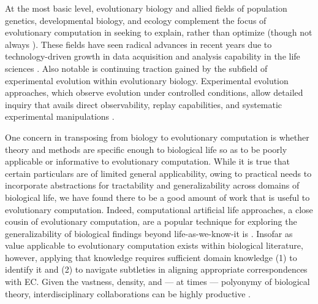At the most basic level, evolutionary biology and allied fields of population genetics, developmental biology, and ecology complement the focus of evolutionary computation in seeking to explain, rather than optimize (though not always \citep{cobb2013directed,carroll2014applying}).
These fields have seen radical advances in recent years due to technology-driven growth in data acquisition and analysis capability in the life sciences \citep{math2018omics,deshpande2024evolution}.
Also notable is continuing traction gained by the subfield of experimental evolution within evolutionary biology.
Experimental evolution approaches, which observe evolution under controlled conditions, allow detailed inquiry that avails direct observability, replay capabilities, and systematic experimental manipulations \citep{kawecki2012experimental}.

One concern in transposing from biology to evolutionary computation is whether theory and methods are specific enough to biological life so as to be poorly applicable or informative to evolutionary computation.
While it is true that certain particulars are of limited general applicability, owing to practical needs to incorporate abstractions for tractability and generalizability across domains of biological life, we have found there to be a good amount of work that is useful to evolutionary computation.
Indeed, computational artificial life approaches, a close cousin of evolutionary computation, are a popular technique for exploring the generalizability of biological findings beyond life-as-we-know-it is \citep{cleland2013general}. %
Insofar as value applicable to evolutionary computation exists within biological literature, however, applying that knowledge requires sufficient domain knowledge (1) to identify it and (2) to navigate subtleties in aligning appropriate correspondences with EC.
Given the vastness, density, and --- at times --- polyonymy of biological theory, interdisciplinary collaborations can be highly productive \citep{goodman2020evolution}.

